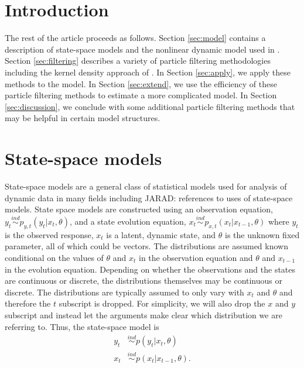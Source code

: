 \documentclass{article}
\newcommand{\jarad}[1]{{\color{red}JARAD: #1}}
\begin{document}
\section{Introduction}

The rest of the article proceeds as follows. Section \ref{sec:model} contains a description of state-space models and the nonlinear dynamic model used in \citet{skvortsov2012monitoring}. Section \ref{sec:filtering} describes a variety of particle filtering methodologies including the kernel density approach of \cite{Liu:West:comb:2001}. In Section \ref{sec:apply}, we apply these methods to the \citet{skvortsov2012monitoring} model. In Section \ref{sec:extend}, we use the efficiency of these particle filtering methods to estimate a more complicated model. In Section \ref{sec:discussion}, we conclude with some additional particle filtering methods that may be helpful in certain model structures.

\section{State-space models \label{sec:model}}

State-space models are a general class of statistical models used for analysis of dynamic data in many fields including \jarad{references to uses of state-space models}. State space models are constructed using an observation equation, $y_t \stackrel{ind}{\sim} p_{y,t}(y_t|x_t,\theta)$, and a state evolution equation, $x_t \stackrel{ind}{\sim} p_{x,t}(x_t|x_{t-1},\theta)$ where $y_t$ is the observed response, $x_t$ is a latent, dynamic state, and $\theta$ is the unknown fixed parameter, all of which could be vectors. The distributions are assumed known conditional on the values of $\theta$ and $x_t$ in the observation equation and $\theta$ and $x_{t-1}$ in the evolution equation. Depending on whether the observations and the states are continuous or discrete, the distributions themselves may be continuous or discrete. The distributions are typically assumed to only vary with $x_t$ and $\theta$ and therefore the $t$ subscript is dropped.
For simplicity, we will also drop the $x$ and $y$ subscript and instead let the arguments make clear which distribution we are referring to. Thus, the state-space model is
\begin{align*}
y_t &\stackrel{ind}{\sim} p(y_t|x_t,\theta) \\
x_t &\stackrel{ind}{\sim} p(x_t|x_{t-1},\theta).
\end{align*}
\end{document}
